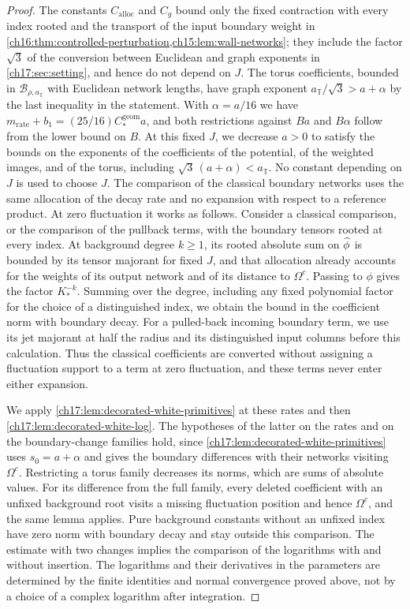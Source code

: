 \begin{proof}
The constants $C_{\mathrm{alloc}}$ and $C_g$ bound only the fixed contraction with every index rooted and the transport of the input boundary weight in \cref{ch16:thm:controlled-perturbation,ch15:lem:wall-networks}; they include the factor $\sqrt3$ of the conversion between Euclidean and graph exponents in \cref{ch17:sec:setting}, and hence do not depend on $J$. The torus coefficients, bounded in $\mathcal B_{\rho,a_{\mathbb T}}$ with Euclidean network lengths, have graph exponent $a_{\mathbb T}/\sqrt3>a+\alpha$ by the last inequality in the statement. With $\alpha=a/16$ we have $m_{\mathrm{rate}}+b_1=(25/16)C_*^{\mathrm{geom}}a$, and both restrictions against $Ba$ and $B\alpha$ follow from the lower bound on $B$. At this fixed $J$, we decrease $a>0$ to satisfy the bounds on the exponents of the coefficients of the potential, of the weighted images, and of the torus, including $\sqrt3\,(a+\alpha)<a_{\mathbb T}$. No constant depending on $J$ is used to choose $J$. The comparison of the classical boundary networks uses the same allocation of the decay rate and no expansion with respect to a reference product. At zero fluctuation it works as follows. Consider a classical comparison, or the comparison of the pullback terms, with the boundary tensors rooted at every index. At background degree $k\ge1$, its rooted absolute sum on $\widehat\phi$ is bounded by its tensor majorant for fixed $J$, and that allocation already accounts for the weights of its output network and of its distance to $\Omega^c$. Passing to $\phi$ gives the factor $K_*^{-k}$. Summing over the degree, including any fixed polynomial factor for the choice of a distinguished index, we obtain the bound in the coefficient norm with boundary decay. For a pulled-back incoming boundary term, we use its jet majorant at half the radius and its distinguished input columns before this calculation. Thus the classical coefficients are converted without assigning a fluctuation support to a term at zero fluctuation, and these terms never enter either expansion.

We apply \cref{ch17:lem:decorated-white-primitives} at these rates and then \cref{ch17:lem:decorated-white-log}. The hypotheses of the latter on the rates and on the boundary-change families hold, since \cref{ch17:lem:decorated-white-primitives} uses $s_0=a+\alpha$ and gives the boundary differences with their networks visiting $\Omega^c$. Restricting a torus family decreases its norms, which are sums of absolute values. For its difference from the full family, every deleted coefficient with an unfixed background root visits a missing fluctuation position and hence $\Omega^c$, and the same lemma applies. Pure background constants without an unfixed index have zero norm with boundary decay and stay outside this comparison. The estimate with two changes implies the comparison of the logarithms with and without insertion. The logarithms and their derivatives in the parameters are determined by the finite identities and normal convergence proved above, not by a choice of a complex logarithm after integration.


\end{proof}
